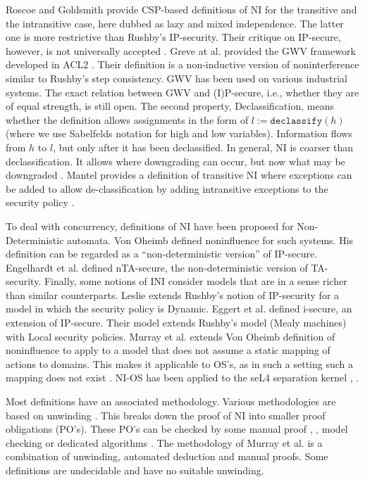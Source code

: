 \documentclass[11pt,a4paper]{article}
\begin{document}
Roscoe and Goldsmith provide CSP-based definitions of NI for the transitive and 
the intransitive case, here dubbed as lazy and mixed independence. The latter 
one is more restrictive than Rushby’s IP-security. Their critique on IP-secure, 
however, is not universally accepted \cite{SKIPaper19}.
 Greve at al. provided the GWV framework 
developed in ACL2 \cite{SKIPaper7}. Their definition is a non-inductive version of 
noninterference similar to Rushby’s step consistency. GWV has been used on 
various industrial systems. The exact relation between GWV and (I)P-secure, 
i.e., whether they are of equal strength, is still open.
The second property, 
Declassification, means whether the definition allows assignments in the form 
of $l := \texttt{declassify}(h)$ (where we use Sabelfelds \cite{SKIPaper6} notation for 
high and low variables). Information flows from $h$ to $l$, but only after it has 
been declassified. In general, NI is coarser than declassification. It allows 
where downgrading can occur, but now what may be downgraded \cite{SKIPaper15}. Mantel 
provides a definition of transitive NI where exceptions can be added to allow 
de-classification by adding intransitive exceptions to the security policy \cite{SKIPaper15}.

To deal with concurrency, definitions of NI have been proposed for 
Non-Deterministic automata. Von Oheimb defined noninfluence for such systems. 
His definition can be regarded as a ``non-deterministic version'' of IP-secure. 
Engelhardt et al. defined nTA-secure, the non-deterministic version of 
TA-security.
Finally, some notions of INI consider models that are in a sense 
richer than similar counterparts. Leslie extends Rushby’s notion of IP-security 
for a model in which the security policy is Dynamic. Eggert et al. defined 
i-secure, an extension of IP-secure. Their model extends Rushby’s model 
(Mealy machines) with Local security policies. Murray et al. extends Von Oheimb 
definition of noninfluence to apply to a model that 
does not assume a static mapping of actions to domains. 
This makes
 it applicable to OS’s, as in such a setting such a mapping does not 
exist \cite{Murray_MBGK_12}. NI-OS has been applied to the seL4 separation kernel 
\cite{Murray_MBGK_12}, \cite{Klein:2009:SFV:1629575.1629596}.
 
Most definitions have an associated methodology. Various methodologies are 
based on unwinding \cite{SKIPaper14}. This breaks down the proof of NI into smaller 
proof obligations (PO’s). These PO’s can be checked by some manual proof 
\cite{rushby92}, \cite{SKIPaper32}, model checking \cite{SKIPaper21} or dedicated 
algorithms \cite{SKIPaper20}. The methodology of 
Murray et al. is a combination of unwinding, automated deduction and manual
proofs. Some definitions are undecidable 
and have no suitable unwinding.
\end{document}
